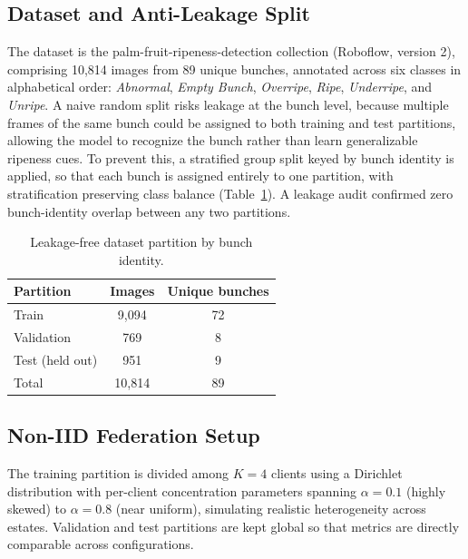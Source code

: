 \documentclass[conference, compsoc, twoside]{IEEEtran}
\begin{document}
\subsection{Dataset and Anti-Leakage Split}
The dataset is the palm-fruit-ripeness-detection collection (Roboflow, version 2), comprising 10,814 images from 89 unique bunches, annotated across six classes in alphabetical order: \textit{Abnormal}, \textit{Empty Bunch}, \textit{Overripe}, \textit{Ripe}, \textit{Underripe}, and \textit{Unripe}. A naive random split risks leakage at the bunch level, because multiple frames of the same bunch could be assigned to both training and test partitions, allowing the model to recognize the bunch rather than learn generalizable ripeness cues. To prevent this, a stratified group split keyed by bunch identity is applied, so that each bunch is assigned entirely to one partition, with stratification preserving class balance (Table~\ref{tab:split}). A leakage audit confirmed zero bunch-identity overlap between any two partitions.

\begin{table}[!htbp]
\centering
\caption{Leakage-free dataset partition by bunch identity.}
\label{tab:split}
\small
\begin{tabular}{lcc}
\hline
Partition       & Images & Unique bunches \\
\hline
Train           & 9{,}094  & 72 \\
Validation      & 769     & 8  \\
Test (held out) & 951     & 9  \\
\hline
Total           & 10{,}814 & 89 \\
\hline
\end{tabular}
\end{table}

\subsection{Non-IID Federation Setup}
The training partition is divided among $K = 4$ clients using a Dirichlet distribution with per-client concentration parameters spanning $\alpha = 0.1$ (highly skewed) to $\alpha = 0.8$ (near uniform), simulating realistic heterogeneity across estates. Validation and test partitions are kept global so that metrics are directly comparable across configurations.
\end{document}
